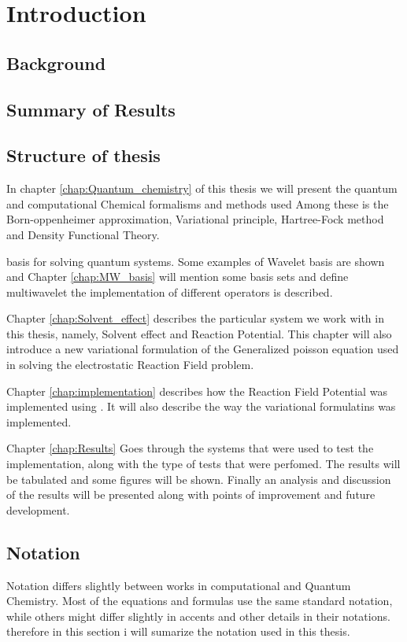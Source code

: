 \documentclass[../master_thesis.tex]{subfiles}
\begin{document}
\chapter{Introduction}
\section{Background}

\section{Summary of Results}

\section{Structure of thesis}
In chapter \ref{chap:Quantum_chemistry} of this thesis we will present the quantum
and computational Chemical formalisms and methods used Among these is the
Born-oppenheimer approximation, Variational principle, Hartree-Fock method and
Density Functional Theory.

basis for solving quantum systems. Some examples of Wavelet basis are shown and
Chapter \ref{chap:MW_basis} will mention some basis sets and define multiwavelet
the implementation of different operators is described.

Chapter \ref{chap:Solvent_effect}
describes the particular system we work with in this thesis, namely, Solvent
effect and Reaction Potential. This chapter will also introduce a new variational
formulation of the Generalized poisson equation used in solving the electrostatic
Reaction Field problem.

Chapter \ref{chap:implementation} describes how the Reaction Field Potential was implemented
using \mrchem. It will also describe the way the variational formulatins was implemented.

Chapter \ref{chap:Results} Goes through the systems that were used to test the implementation,
along with the type of tests that were perfomed. The results will be tabulated and
some figures will be shown. Finally an analysis and discussion of the results will be
presented along with points of improvement and future development.
\section{Notation}
Notation differs slightly between works in computational and Quantum Chemistry.
Most of the equations and formulas use the same standard notation, while others
might differ slightly in accents and other details in their notations. therefore
in this section i will sumarize the notation used in this thesis.
\end{document}
